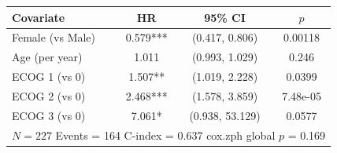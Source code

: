 \begin{tabular}{lccc}
  \toprule
  Covariate & HR & 95\% CI & $p$ \\
  \midrule
  Female (vs Male) & 0.579*** & (0.417, 0.806) & 0.00118 \\
  Age (per year) & 1.011 & (0.993, 1.029) & 0.246 \\
  ECOG 1 (vs 0) & 1.507** & (1.019, 2.228) & 0.0399 \\
  ECOG 2 (vs 0) & 2.468*** & (1.578, 3.859) & 7.48e-05 \\
  ECOG 3 (vs 0) & 7.061* & (0.938, 53.129) & 0.0577 \\
  \midrule
  \multicolumn{4}{l}{\small $N = 227$ \quad Events = 164 \quad C-index = 0.637 \quad cox.zph global $p$ = 0.169} \\
  \bottomrule
\end{tabular}
